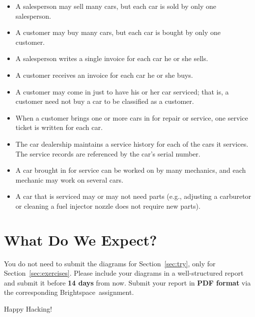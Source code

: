 \documentclass{article}
\begin{document}
\begin{enumerate}
        \begin{itemize}
            \item A salesperson may sell many cars, but each car is sold by only one salesperson.
            \item A customer may buy many cars, but each car is bought by only one customer.
            \item A salesperson writes a single invoice for each car he or she sells.
            \item A customer receives an invoice for each car he or she buys.
            \item A customer may come in just to have his or her car serviced; that is, a customer need not buy a car to be classified as a customer.
            \item When a customer brings one or more cars in for repair or service, one service ticket is written for each car.
            \item The car dealership maintains a service history for each of the cars it services. The service records are referenced by the car’s serial number.
            \item A car brought in for service can be worked on by many mechanics, and each mechanic may work on several cars.
            \item A car that is serviced may or may not need parts (e.g., adjusting a carburetor or cleaning a fuel injector nozzle does not require new parts).
        \end{itemize}
\end{enumerate}

\section{What Do We Expect?}
You do not need to submit the diagrams for Section~\ref{sec:try}, only for Section~\ref{sec:exercises}. Please include your diagrams in a well-structured report and submit it before \textbf{14 days} from now. Submit your report in \textbf{PDF format} via the corresponding Brightspace\texttrademark ~assignment.

\vspace{5mm}
Happy Hacking! 
\end{document}
